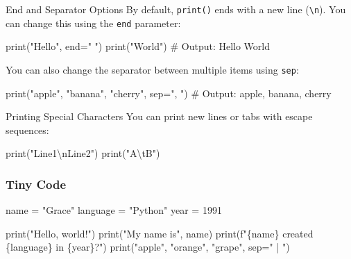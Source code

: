 \documentclass[
  letterpaper,
  DIV=11,
  numbers=noendperiod]{scrreprt}
\newenvironment{Shaded}{\begin{snugshade}}{\end{snugshade}}
\newcommand{\BuiltInTok}[1]{\textcolor[rgb]{0.00,0.23,0.31}{#1}}
\newcommand{\CharTok}[1]{\textcolor[rgb]{0.13,0.47,0.30}{#1}}
\newcommand{\CommentTok}[1]{\textcolor[rgb]{0.37,0.37,0.37}{#1}}
\newcommand{\DecValTok}[1]{\textcolor[rgb]{0.68,0.00,0.00}{#1}}
\newcommand{\NormalTok}[1]{\textcolor[rgb]{0.00,0.23,0.31}{#1}}
\newcommand{\OperatorTok}[1]{\textcolor[rgb]{0.37,0.37,0.37}{#1}}
\newcommand{\SpecialCharTok}[1]{\textcolor[rgb]{0.37,0.37,0.37}{#1}}
\newcommand{\SpecialStringTok}[1]{\textcolor[rgb]{0.13,0.47,0.30}{#1}}
\newcommand{\StringTok}[1]{\textcolor[rgb]{0.13,0.47,0.30}{#1}}
\begin{document}
End and Separator Options By default, \texttt{print()} ends with a new
line (\texttt{\textbackslash{}n}). You can change this using the
\texttt{end} parameter:

\begin{Shaded}
\begin{Highlighting}[]
\BuiltInTok{print}\NormalTok{(}\StringTok{"Hello"}\NormalTok{, end}\OperatorTok{=}\StringTok{" "}\NormalTok{)}
\BuiltInTok{print}\NormalTok{(}\StringTok{"World"}\NormalTok{)}
\CommentTok{\# Output: Hello World}
\end{Highlighting}
\end{Shaded}

You can also change the separator between multiple items using
\texttt{sep}:

\begin{Shaded}
\begin{Highlighting}[]
\BuiltInTok{print}\NormalTok{(}\StringTok{"apple"}\NormalTok{, }\StringTok{"banana"}\NormalTok{, }\StringTok{"cherry"}\NormalTok{, sep}\OperatorTok{=}\StringTok{", "}\NormalTok{)}
\CommentTok{\# Output: apple, banana, cherry}
\end{Highlighting}
\end{Shaded}

Printing Special Characters You can print new lines or tabs with escape
sequences:

\begin{Shaded}
\begin{Highlighting}[]
\BuiltInTok{print}\NormalTok{(}\StringTok{"Line1}\CharTok{\textbackslash{}n}\StringTok{Line2"}\NormalTok{)}
\BuiltInTok{print}\NormalTok{(}\StringTok{"A}\CharTok{\textbackslash{}t}\StringTok{B"}\NormalTok{)}
\end{Highlighting}
\end{Shaded}

\subsubsection{Tiny Code}\label{tiny-code-10}

\begin{Shaded}
\begin{Highlighting}[]
\NormalTok{name }\OperatorTok{=} \StringTok{"Grace"}
\NormalTok{language }\OperatorTok{=} \StringTok{"Python"}
\NormalTok{year }\OperatorTok{=} \DecValTok{1991}

\BuiltInTok{print}\NormalTok{(}\StringTok{"Hello, world!"}\NormalTok{)}
\BuiltInTok{print}\NormalTok{(}\StringTok{"My name is"}\NormalTok{, name)}
\BuiltInTok{print}\NormalTok{(}\SpecialStringTok{f"}\SpecialCharTok{\{}\NormalTok{name}\SpecialCharTok{\}}\SpecialStringTok{ created }\SpecialCharTok{\{}\NormalTok{language}\SpecialCharTok{\}}\SpecialStringTok{ in }\SpecialCharTok{\{}\NormalTok{year}\SpecialCharTok{\}}\SpecialStringTok{?"}\NormalTok{)}
\BuiltInTok{print}\NormalTok{(}\StringTok{"apple"}\NormalTok{, }\StringTok{"orange"}\NormalTok{, }\StringTok{"grape"}\NormalTok{, sep}\OperatorTok{=}\StringTok{" | "}\NormalTok{)}
\end{Highlighting}
\end{Shaded}
\end{document}
